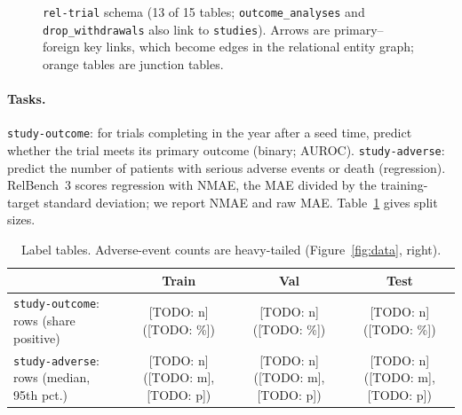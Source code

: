 \documentclass{article}
\newcommand{\todo}[1]{\textcolor{red!70!black}{[TODO: #1]}}
\def\RowsOutcomeTrain{\todo{n}}\def\RowsOutcomeVal{\todo{n}}\def\RowsOutcomeTest{\todo{n}}
\def\PosOutcomeTrain{\todo{\%}}\def\PosOutcomeVal{\todo{\%}}\def\PosOutcomeTest{\todo{\%}}
\def\RowsAdverseTrain{\todo{n}}\def\RowsAdverseVal{\todo{n}}\def\RowsAdverseTest{\todo{n}}
\def\MedianAdverseTrain{\todo{m}}\def\MedianAdverseVal{\todo{m}}\def\MedianAdverseTest{\todo{m}}
\def\PtfAdverseTrain{\todo{p}}\def\PtfAdverseVal{\todo{p}}\def\PtfAdverseTest{\todo{p}}
\begin{document}
\begin{figure}[t]
\centering
{}
\caption{\texttt{rel-trial} schema (13 of 15 tables; \texttt{outcome\_analyses} and
\texttt{drop\_withdrawals} also link to \texttt{studies}). Arrows are primary--foreign key
links, which become edges in the relational entity graph; orange tables are junction tables.}
\label{fig:schema}
\vspace{-0.8em}
\end{figure}

\paragraph{Tasks.} \texttt{study-outcome}: for trials completing in the year after a seed
time, predict whether the trial meets its primary outcome (binary; AUROC). \texttt{study-adverse}:
predict the number of patients with serious adverse events or death (regression). RelBench~3
scores regression with NMAE, the MAE divided by the training-target standard deviation; we
report NMAE and raw MAE. Table~\ref{tab:splits} gives split sizes.

\begin{table}[h]
\centering\small
\caption{Label tables. Adverse-event counts are heavy-tailed (Figure~\ref{fig:data}, right).}
\label{tab:splits}
\begin{tabular}{lccc}
\toprule
 & Train & Val & Test \\
\midrule
\texttt{study-outcome}: rows (share positive) & \RowsOutcomeTrain{} (\PosOutcomeTrain) & \RowsOutcomeVal{} (\PosOutcomeVal) & \RowsOutcomeTest{} (\PosOutcomeTest) \\
\texttt{study-adverse}: rows (median, 95th pct.) & \RowsAdverseTrain{} (\MedianAdverseTrain, \PtfAdverseTrain) & \RowsAdverseVal{} (\MedianAdverseVal, \PtfAdverseVal) & \RowsAdverseTest{} (\MedianAdverseTest, \PtfAdverseTest) \\
\bottomrule
\end{tabular}
\end{table}
\end{document}
